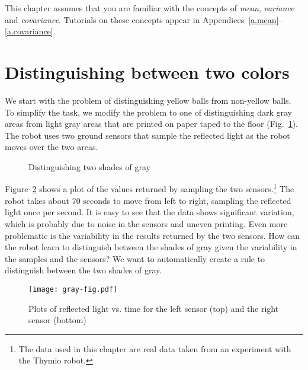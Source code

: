 This chapter assumes that you are familiar with the concepts of \emph{mean}, \emph{variance} and \emph{covariance}. Tutorials on these concepts appear in Appendices~\ref{a.mean}--\ref{a.covariance}.

\section{Distinguishing between two colors}\label{s.sorting-onesensor}

We start with the problem of distinguishing yellow balls from non-yellow balls. To simplify the task, we modify the problem to one of distinguishing dark gray areas from light gray areas that are printed on paper taped to the floor (Fig.~\ref{fig.closegrays1}). The robot uses two ground sensors that sample the reflected light as the robot moves over the two areas.

\begin{figure}
\begin{center}
\end{center}
\caption{Distinguishing two shades of gray}\label{fig.closegrays1}
\end{figure}

Figure~\ref{fig.closegrays2} shows a plot of the values returned by sampling the two sensors.\footnote{The data used in this chapter are real data taken from an experiment with the Thymio robot.} The robot takes about $70$ seconds to move from left to right, sampling the reflected light once per second. It is easy to see that the data shows significant variation, which is probably due to noise in the sensors and uneven printing. Even more problematic is the variability in the results returned by the two sensors. How can the robot learn to distinguish between the shades of gray given the variability in the samples and the sensors? We want to automatically create a rule to distinguish between the two shades of gray.

\begin{figure}
\begin{center}
\texttt{[image: gray-fig.pdf]}
\end{center}
\caption{Plots of reflected light vs. time for the left sensor (top) and the right sensor (bottom)}\label{fig.closegrays2}
\end{figure}

